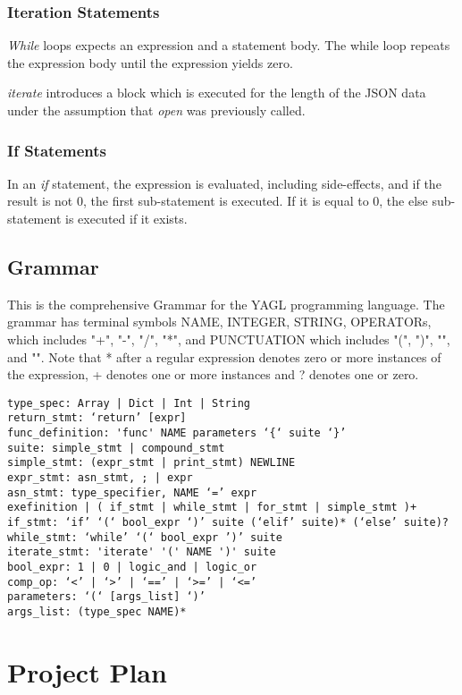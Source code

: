 \documentclass[12pt]{article}
\begin{document}
\subsubsection{Iteration Statements}
\textit{While} loops expects an expression and a statement body. The while loop repeats the expression body until the expression yields zero.

\textit{iterate} introduces a block which is executed 
for the length of the JSON data under the assumption that \textit{open} was previously called. 

\subsubsection{If Statements}

In an \textit{if} statement, the expression is evaluated, including side-effects, and if the result is not 0, the first sub-statement is executed. If it is equal to 0, the else sub-statement is executed if it exists.

\subsection{Grammar}
This is the comprehensive Grammar for the YAGL programming language. The grammar has terminal symbols NAME, INTEGER, STRING, OPERATORs, which includes "+", "-", "/", "*", and PUNCTUATION which includes "(", ")", "{", and "}". Note that * after a regular expression denotes zero or more instances of the expression, + denotes one or more instances and ? denotes one or zero.

\begin{lstlisting}
type_spec: Array | Dict | Int | String
return_stmt: ‘return’ [expr]
func_definition: 'func' NAME parameters ‘{‘ suite ‘}’
suite: simple_stmt | compound_stmt
simple_stmt: (expr_stmt | print_stmt) NEWLINE
expr_stmt: asn_stmt, ; | expr 
asn_stmt: type_specifier, NAME ‘=’ expr
exefinition | ( if_stmt | while_stmt | for_stmt | simple_stmt )+
if_stmt: ‘if’ ‘(‘ bool_expr ‘)’ suite (‘elif’ suite)* (‘else’ suite)?
while_stmt: ‘while’ ‘(‘ bool_expr ’)’ suite
iterate_stmt: 'iterate' '(' NAME ')' suite
bool_expr: 1 | 0 | logic_and | logic_or 
comp_op: ‘<’ | ‘>’ | ‘==’ | ‘>=’ | ‘<=’
parameters: ‘(‘ [args_list] ‘)’
args_list: (type_spec NAME)*
\end{lstlisting}

\section{Project Plan}
\end{document}

